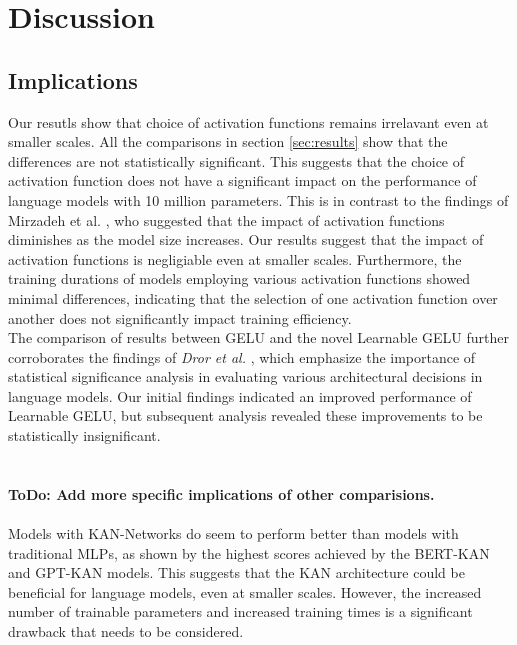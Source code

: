\section{Discussion} %
\label{sec:discussion}

\subsection{Implications}
Our resutls show that choice of activation functions remains irrelavant even at smaller scales. All the comparisons in section \ref{sec:results} show that the differences are not statistically significant. This suggests that the choice of activation function does not have a significant impact on the performance of language models with 10 million parameters. This is in contrast to the findings of Mirzadeh et al. \cite{Mirzadeh2023}, who suggested that the impact of activation functions diminishes as the model size increases. Our results suggest that the impact of activation functions is negligiable even at smaller scales. Furthermore, the training durations of models employing various activation functions showed minimal differences, indicating that the selection of one activation function over another does not significantly impact training efficiency.\\ 
The comparison of results between GELU and the novel Learnable GELU further corroborates the findings of \textit{Dror et al.} \cite{dror2018hitchhikers}, which emphasize the importance of statistical significance analysis in evaluating various architectural decisions in language models. Our initial findings indicated an improved performance of Learnable GELU, but subsequent analysis revealed these improvements to be statistically insignificant.\\
\\\\
\textbf{ToDo: Add more specific implications of other comparisions.}
\\\\
Models with KAN-Networks do seem to perform better than models with traditional MLPs, as shown by the highest scores achieved by the BERT-KAN and GPT-KAN models. This suggests that the KAN architecture could be beneficial for language models, even at smaller scales. However, the increased number of trainable parameters and increased training times is a significant drawback that needs to be considered. 

